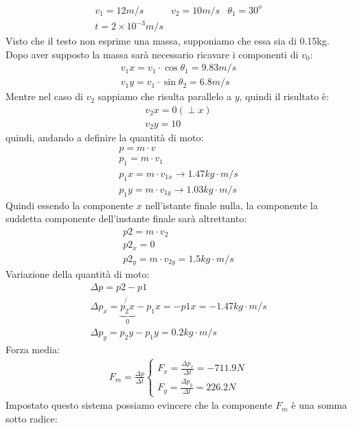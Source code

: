 \documentclass{report}
\begin{document}
\begin{enumerate}
\begin{equation*}
  \begin{matrix}
    v_1=12m/s & v_2=10m/s & \theta_1=30^o\\
    t=2\times 10^{-3}m/s
  \end{matrix}
\end{equation*}
Visto che il testo non esprime una massa, supponiamo che essa sia di 0.15kg.\\
Dopo aver supposto la massa sarà necessario ricavare i componenti di $v_0$:
\begin{eqnarray*}
  v_1x=v_1\cdot \cos \theta_1 = 9.83m/s\\
  v_1y=v_1\cdot \sin \theta_2 = 6.8m/s
\end{eqnarray*}
Mentre nel caso di $v_2$ sappiamo che risulta parallelo a $y$, quindi il risultato è:
\begin{eqnarray*}
  v_2x=0 (\perp x)\\
  v_2y=10
\end{eqnarray*}
quindi, andando a definire la quantità di moto:
\begin{eqnarray*}
  p=m\cdot v\\
  p_1=m\cdot v_1\\
  p_1x=m\cdot v_{1x} \to 1.47kg\cdot m/s\\
  p_1y=m\cdot v_{1y} \to 1.03kg\cdot m/s
\end{eqnarray*}
Quindi essendo la componente $x$ nell'istante finale nulla, la componente la suddetta componente dell'instante finale sarà altrettanto:
\begin{eqnarray*}
  p2=m\cdot v_2\\
  p2_x=0\\
  p2_y=m\cdot v_{2y}=1.5kg\cdot m/s
\end{eqnarray*}
Variazione della quantità di moto:
\begin{eqnarray*}
  \Delta p=p2-p1\\
  \Delta p_x=\underbrace{\not{p_2x}}_{0}-p_1x=-p1x=-1.47kg\cdot m/s \\
  \Delta p_y=p_2y-p_1y= 0.2 kg\cdot m/s
\end{eqnarray*}
Forza media:
\begin{eqnarray*}
  F_m=\frac{\Delta p}{\Delta t}
  \begin{cases}
    F_x=\frac{\Delta p_x}{\Delta t}=-711.9N\\
    F_y=\frac{\Delta p_y}{\Delta t}=226.2N
  \end{cases}
\end{eqnarray*}
Impostato questo sistema possiamo evincere che la componente $F_m$ è una somma sotto radice:

\end{enumerate}
\end{document}
